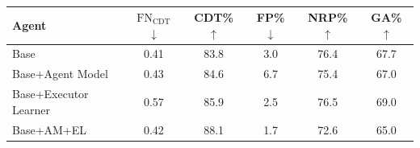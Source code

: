 \begin{table}[htbp]
\centering
\footnotesize
\begin{tabular}{l c c c c c}
\toprule
\textbf{Agent} & $\text{FN}_\text{CDT}$ $\downarrow$ & CDT\% $\uparrow$ & FP\% $\downarrow$ & NRP\% $\uparrow$ & GA\% $\uparrow$ \\
\midrule
Base                  & 0.41 & 83.8 & 3.0 & 76.4 & 67.7 \\
Base+Agent Model      & 0.43 & 84.6 & 6.7 & 75.4 & 67.0 \\
Base+Executor Learner & 0.57 & 85.9 & 2.5 & 76.5 & 69.0 \\
Base+AM+EL            & 0.42 & 88.1 & 1.7 & 72.6 & 65.0 \\
\bottomrule
\end{tabular}
\caption{}
\label{tab:known_systemic_results}
\end{table}
